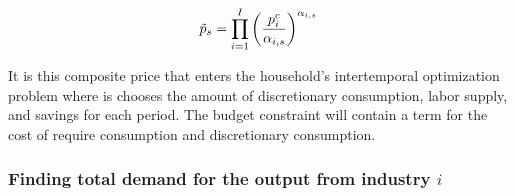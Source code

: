 \documentclass[letterpaper,12pt]{article}
\theoremstyle{definition}
\begin{document}
\begin{spacing}{1.5}
\begin{equation} \label{eqn:composite_price2}
\tilde{p}_{s} =  \prod_{i=1}^{I}\left( \frac{p^{c}_{i}}{\alpha_{i,s}} \right)^{\alpha_{i,s}} \\
\end{equation}

It is this composite price that enters the household's intertemporal optimization problem where is chooses the amount of discretionary consumption, labor supply, and savings for each period.  The budget constraint will contain a term for the cost of require consumption and discretionary consumption.  


%
%
%
%
%
%

\subsubsection*{Finding total demand for the output from industry $i$}


\end{spacing}
\end{document}

